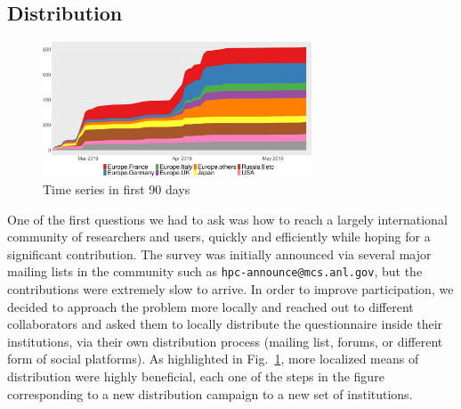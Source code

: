 \documentclass[preprint,5p,times]{elsarticle}
\begin{document}
\subsection*{Distribution}

\begin{figure}[tb]
  \begin{center}
    \includegraphics[width=8.0cm]{R-scripts/TimeSeries.pdf}
    \vspace{-2mm}
    \caption{Time series in first 90 days}
    \label{fig:time-series}
  \end{center}
\end{figure}

One of the first questions we had to ask was how to reach a largely
international community of researchers and users, quickly and
efficiently while hoping for a significant contribution.
%
The survey was initially announced via several major mailing lists in the
community such as {\tt hpc-announce@mcs.anl.gov}, but the contributions were
extremely slow to arrive. In order to improve participation, we decided to
approach the problem more locally and reached out to different collaborators and
asked them to locally distribute the questionnaire inside their institutions,
via their own distribution process (mailing list, forums, or different form of
social platforms). As highlighted in Fig.~\ref{fig:time-series}, more localized
means of distribution were highly beneficial, each one of the steps in the
figure corresponding to a new distribution campaign to a new set of
institutions.

\end{document}
